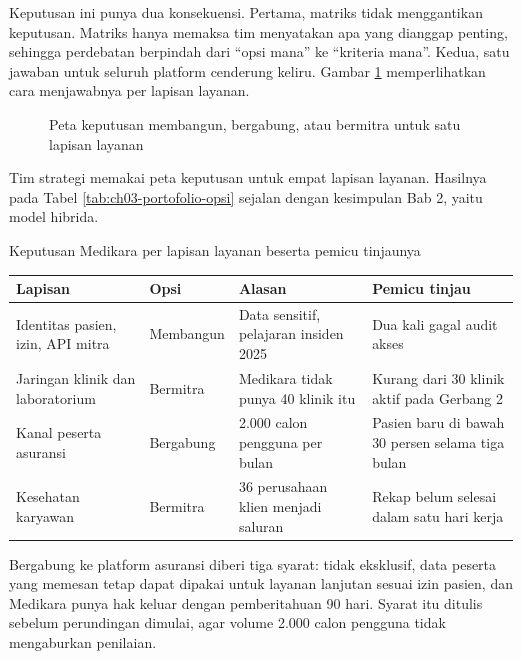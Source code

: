 Keputusan ini punya dua konsekuensi. Pertama, matriks tidak menggantikan keputusan. Matriks hanya memaksa tim
menyatakan apa yang dianggap penting, sehingga perdebatan berpindah dari ``opsi mana'' ke ``kriteria mana''.
Kedua, satu jawaban untuk seluruh platform cenderung keliru. Gambar \ref{fig:ch03-peta-keputusan}
memperlihatkan cara menjawabnya per lapisan layanan.

\begin{figure}[!htb]
  \centering
  
  \caption{Peta keputusan membangun, bergabung, atau bermitra untuk satu lapisan layanan}
  \label{fig:ch03-peta-keputusan}
\end{figure}

\begin{kasus}[title={Kasus Medikara Health: Satu Keputusan per Lapisan}]
Tim strategi memakai peta keputusan untuk empat lapisan layanan. Hasilnya pada Tabel
\ref{tab:ch03-portofolio-opsi} sejalan dengan kesimpulan Bab 2, yaitu model hibrida.

\begin{center}
  \captionsetup{type=table}
  \caption{Keputusan Medikara per lapisan layanan beserta pemicu tinjaunya}
  \label{tab:ch03-portofolio-opsi}
  \small
  \begin{tabularx}{\linewidth}{Z{2.5cm}Z{1.9cm}YY}
    \hline
    \textbf{Lapisan} & \textbf{Opsi} & \textbf{Alasan} & \textbf{Pemicu tinjau} \\ \hline
    Identitas pasien, izin, API mitra & Membangun & Data sensitif, pelajaran insiden 2025 & Dua kali gagal audit akses \\ \hline
    Jaringan klinik dan laboratorium & Bermitra & Medikara tidak punya 40 klinik itu & Kurang dari 30 klinik aktif pada Gerbang 2 \\ \hline
    Kanal peserta asuransi & Bergabung & 2.000 calon pengguna per bulan & Pasien baru di bawah 30 persen selama tiga bulan \\ \hline
    Kesehatan karyawan & Bermitra & 36 perusahaan klien menjadi saluran & Rekap belum selesai dalam satu hari kerja \\ \hline
  \end{tabularx}
\end{center}

Bergabung ke platform asuransi diberi tiga syarat: tidak eksklusif, data peserta yang memesan tetap dapat
dipakai untuk layanan lanjutan sesuai izin pasien, dan Medikara punya hak keluar dengan pemberitahuan 90 hari.
Syarat itu ditulis sebelum perundingan dimulai, agar volume 2.000 calon pengguna tidak mengaburkan penilaian.
\end{kasus}

